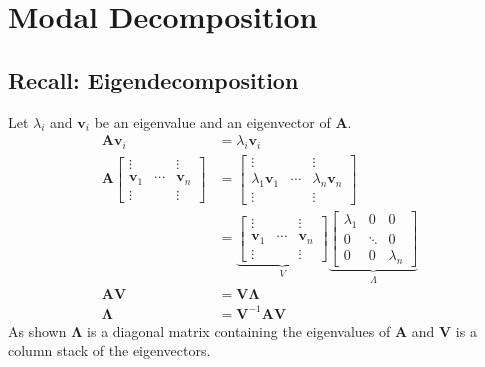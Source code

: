 \section{Modal Decomposition}

\subsection{Recall: Eigendecomposition}
Let $\lambda_i$ and $\mathbf{v}_i$ be an eigenvalue and an eigenvector of $\mathbf{A}$.
\begin{align*}
    \mathbf{Av}_i & = \lambda_i \mathbf{v}_i                                   \\
    \mathbf{A} \begin{bmatrix}
                   \vdots       &        & \vdots       \\
                   \mathbf{v}_1 & \cdots & \mathbf{v}_n \\
                   \vdots       &        & \vdots
               \end{bmatrix}
                  & = \begin{bmatrix}
                          \vdots                 &        & \vdots                 \\
                          \lambda_1 \mathbf{v}_1 & \cdots & \lambda_n \mathbf{v}_n \\
                          \vdots                 &        & \vdots
                      \end{bmatrix} \\
                  & = \underbrace{\begin{bmatrix}
                                          \vdots       &        & \vdots       \\
                                          \mathbf{v}_1 & \cdots & \mathbf{v}_n \\
                                          \vdots       &        & \vdots
                                      \end{bmatrix}}_{V}
    \underbrace{\begin{bmatrix}
                        \lambda_1 & 0      & 0         \\
                        0         & \ddots & 0         \\
                        0         & 0      & \lambda_n
                    \end{bmatrix}}_{\Lambda}                                 \\
    \mathbf{AV}   & = \mathbf{V}\bm{\Lambda}                                   \\
    \bm{\Lambda}  & = \mathbf{V}^{-1}\mathbf{AV}
\end{align*}
As shown $\bm{\Lambda}$ is a diagonal matrix containing the eigenvalues of $\mathbf{A}$ and $\mathbf{V}$ is a column stack of the eigenvectors.

